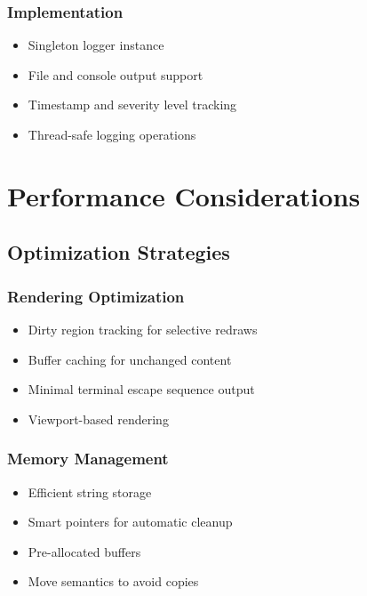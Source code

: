 \documentclass[12pt,a4paper,oneside,openany]{report}
\begin{document}
\subsection{Implementation}

\begin{itemize}
	\item Singleton logger instance
	\item File and console output support
	\item Timestamp and severity level tracking
	\item Thread-safe logging operations
\end{itemize}

\chapter{Performance Considerations}

\section{Optimization Strategies}

\subsection{Rendering Optimization}

\begin{itemize}
	\item Dirty region tracking for selective redraws
	\item Buffer caching for unchanged content
	\item Minimal terminal escape sequence output
	\item Viewport-based rendering
\end{itemize}

\subsection{Memory Management}

\begin{itemize}
	\item Efficient string storage
	\item Smart pointers for automatic cleanup
	\item Pre-allocated buffers
	\item Move semantics to avoid copies
\end{itemize}
\end{document}
